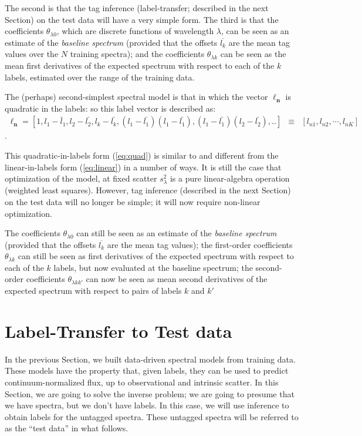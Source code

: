 \documentclass[12pt, preprint]{aastex}
\newcommand{\sectionname}{Section}
\newcommand{\set}[1]{\bm{#1}}
\newcommand{\mean}[1]{\overline{#1}}
\begin{document}
%
The second is that the tag inference (label-transfer; described in the
next Section) on the test data will have a very simple form.
The third is that the coefficients $\theta_{\lambda 0}$, which are discrete
functions of wavelength $\lambda$, can be seen as an estimate of
the \emph{baseline spectrum} (provided that the offsets $\mean{l_k}$ are
the mean tag values over the $N$ training spectra); and the
coefficients $\theta_{\lambda k}$ can be seen as the mean first derivatives of
the expected spectrum with respect to each of the $k$ labels, estimated
over the range of the training data.

The (perhaps) second-simplest spectral model is that in which the
vector $\set{\ell_n}$ is quadratic in the labels: so this label vector is described as:
\begin{eqnarray}
\set{\ell_n} =  [1, l_1 - \bar{l}_1, l_2 - \bar{l_2}, l_k - \bar{l_k}, (l_1 - \bar{l_1})(l_1 - \bar{l_1}), (l_1 - \bar{l_1})(l_2 - \bar{l_2}), .. ] &\equiv& [l_{n1}, l_{n2}, \cdots, l_{nK}] 
\label{eq:quad}
\end{eqnarray}.

This quadratic-in-labels form (\ref{eq:quad}) is similar to and
different from the linear-in-labels form (\ref{eq:linear}) in a number
of ways.
It is still the case that optimization of the model, at fixed scatter
$s_\lambda^2$ is a pure linear-algebra operation (weighted least
squares).
However, tag inference (described in the next Section) on the test
data will no longer be simple; it will now require non-linear
optimization.

The coefficients $\theta_{\lambda 0}$ can still be seen as an estimate of the
\emph{baseline spectrum} (provided that the offsets $\mean{l_k}$ are the
mean tag values); the first-order coefficients $\theta_{\lambda k}$ can still
be seen as first derivatives of the expected spectrum with respect to
each of the $k$ labels, but now evaluated at the baseline spectrum; the
second-order coefficients $\theta_{\lambda kk'}$ can now be seen as mean
second derivatives of the expected spectrum with respect to pairs of
labels $k$ and $k'$



\section{Label-Transfer to Test data}
\label{sec:paramestimate}

In the previous \sectionname, we built data-driven spectral models
from training data.
These models have the property that, given labels, they can be used to
predict continuum-normalized flux, up to observational and intrinsic
scatter.
In this \sectionname, we are going to solve the inverse problem; we
are going to presume that we have spectra, but we don't have labels.
In this case, we will use inference to obtain labels for the untagged
spectra.
These untagged spectra will be referred to as the ``test data'' in
what follows.
\end{document}
